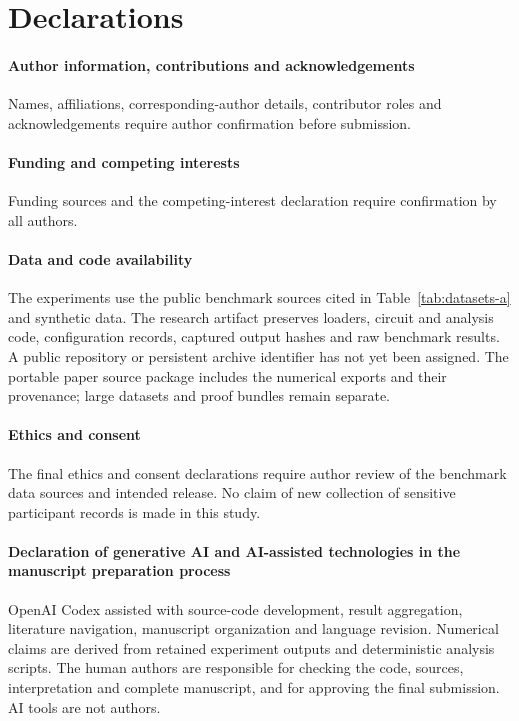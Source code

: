 \documentclass[5p,times,twocolumn]{elsarticle}
\theoremstyle{plain}
\theoremstyle{definition}
\theoremstyle{remark}
\begin{document}
\section*{Declarations}
\paragraph{Author information, contributions and acknowledgements}
Names, affiliations, corresponding-author details, contributor roles and acknowledgements require author confirmation before submission.
\paragraph{Funding and competing interests}
Funding sources and the competing-interest declaration require confirmation by all authors.
\paragraph{Data and code availability}
The experiments use the public benchmark sources cited in Table~\ref{tab:datasets-a} and synthetic data. The research artifact preserves loaders, circuit and analysis code, configuration records, captured output hashes and raw benchmark results. A public repository or persistent archive identifier has not yet been assigned. The portable paper source package includes the numerical exports and their provenance; large datasets and proof bundles remain separate.
\paragraph{Ethics and consent}
The final ethics and consent declarations require author review of the benchmark data sources and intended release. No claim of new collection of sensitive participant records is made in this study.
\paragraph{Declaration of generative AI and AI-assisted technologies in the manuscript preparation process}
OpenAI Codex assisted with source-code development, result aggregation, literature navigation, manuscript organization and language revision. Numerical claims are derived from retained experiment outputs and deterministic analysis scripts. The human authors are responsible for checking the code, sources, interpretation and complete manuscript, and for approving the final submission. AI tools are not authors.



\end{document}
